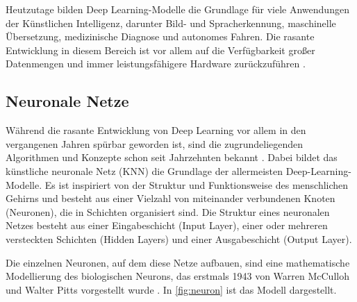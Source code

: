 Heutzutage bilden Deep Learning-Modelle die Grundlage für viele Anwendungen der Künstlichen Intelligenz, darunter Bild- und Spracherkennung, maschinelle Übersetzung, medizinische Diagnose und autonomes Fahren. Die rasante Entwicklung in diesem Bereich ist vor allem auf die Verfügbarkeit großer Datenmengen und immer leistungsfähigere Hardware zurückzuführen \parencite{Goodfellow2016deeplearning}. %

\subsection{Neuronale Netze} \label{subsec:neural-networks}

Während die rasante Entwicklung von Deep Learning vor allem in den vergangenen Jahren spürbar geworden ist, sind die zugrundeliegenden Algorithmen und Konzepte schon seit Jahrzehnten bekannt \parencite{Zhou2021machinelearning}. Dabei bildet das künstliche neuronale Netz (KNN) die Grundlage der allermeisten Deep-Learning-Modelle. Es ist inspiriert von der Struktur und Funktionsweise des menschlichen Gehirns und besteht aus einer Vielzahl von miteinander verbundenen Knoten (Neuronen), die in Schichten organisiert sind. Die Struktur eines neuronalen Netzes besteht aus einer Eingabeschicht (Input Layer), einer oder mehreren versteckten Schichten (Hidden Layers) und einer Ausgabeschicht (Output Layer). %


Die einzelnen Neuronen, auf dem diese Netze aufbauen, sind eine mathematische Modellierung des biologischen Neurons, das erstmals 1943 von Warren McCulloh und Walter Pitts vorgestellt wurde \parencite{Zhou2021machinelearning}. In \autoref{fig:neuron} ist das Modell dargestellt.

